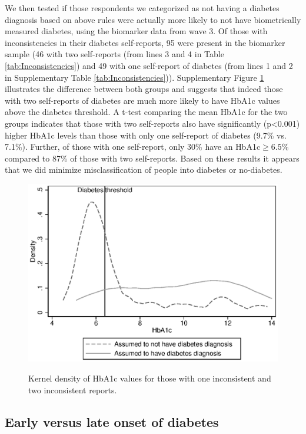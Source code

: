 \documentclass[12pt,english]{article}
\begin{document}
We then tested if those respondents we categorized as not having a diabetes diagnosis based on above rules were actually more likely to not have biometrically measured diabetes, using the biomarker data from wave 3. Of those with inconsistencies in their diabetes self-reports, 95 were present in the biomarker sample (46 with two self-reports (from lines 3 and 4 in Table \ref{tab:Inconsistencies}) and 49 with one self-report of diabetes (from lines 1 and 2 in Supplementary Table \ref{tab:Inconsistencies})). Supplementary Figure \ref{fig:kdens_inconsistency_hba1c} illustrates the difference between both groups and suggests that indeed those with two self-reports of diabetes are much more likely to have \ac{HbA1c} values above the diabetes threshold. A t-test comparing the mean \ac{HbA1c} for the two groups indicates that those with two self-reports also have significantly (p<0.001) higher \ac{HbA1c} levels than those with only one self-report of diabetes (9.7\% vs. 7.1\%). Further, of those with one self-report,  only 30\% have an \ac{HbA1c}$\geq6.5$\% compared to 87\% of those with two self-reports. Based on these results it appears that we did minimize misclassification of people into diabetes or no-diabetes. 

\begin{figure}[h!]
	\caption{\label{fig:kdens_inconsistency_hba1c}Kernel density of HbA1c values for those with one inconsistent and two inconsistent reports.}%
	\begin{center}
		\includegraphics[width=.7\linewidth]{figures/kdensity_hba1c_inconsist.eps}\\
	\end{center}
\end{figure}


\clearpage

\subsection*{Early versus late onset of diabetes}
\end{document}
